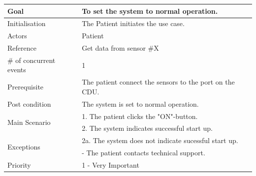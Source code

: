 \begin{table}[H]
	\centering
	\begin{tabular}{|l|p{10cm}|}
	\hline
	Goal 							& To set the system to normal operation. \\ \hline
	Initialisation 					& The Patient initiates the use case. \\ \hline
	\multirow{1}{*}{Actors} 		& Patient \\ 
 \hline
	Reference 						& Get data from sensor \#X \\ \hline
	\# of concurrent events 		& 1 \\ \hline
	Prerequisite  					& The patient connect the sensors to the port on the CDU. \\ \hline
	Post condition 					& The system is set to normal operation. \\ \hline
	\multirow{2}{*}{Main Scenario} 	& 1. The patient clicks the  "ON"-button. \\
	& 2. The system indicates successful start up.\\ \hline
	\multirow{2}{*}{Exceptions} & 2a. The system does not indicate sucessful start up. \\
	& - The patient contacts technical support. \\ \hline
	Priority					& 1 - Very Important\\\hline
	\end{tabular}
\end{table}


